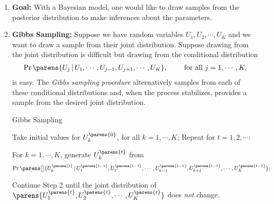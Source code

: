 \documentclass[12pt]{article}
\begin{document}
\begin{enumerate}[label=\textbf{\arabic*.}]
	
	\item \textbf{Goal:} With a Bayesian model, one would like to draw samples from the posterior distribution to make inferences about the parameters. 
	
	\item \textbf{Gibbs Sampling:} Suppose we have random variables $U_1, U_2, \cdots, U_K$ and we want to draw a sample from their joint distribution. Suppose drawing from the joint distribution is difficult but drawing from the conditional distribution 
	\begin{align*}
		\Pr \parens{U_j \,\vert\, U_1, \cdots, U_{j-1}, U_{j+1}, \cdots, U_K}, \qquad \text{ for all } j = 1, \cdots, K, 
	\end{align*}
	is easy. The \emph{Gibbs sampling procedure} alternatively samples from each of these conditional distributions and, when the process stabilizes, provides a sample from the desired joint distribution. 
	
	\begin{minipage}{\linewidth}
		\begin{algorithm}[H]
			\caption{Gibbs Sampling}\label{algo-gibbs}
			\begin{algorithmic}[1]
				\STATE Take initial values for $U_k^{\parens{0}}$, for all $k = 1, \cdots, K$; 
				\STATE Repeat for $t = 1, 2, \cdots$: 
				
				For $k = 1, \cdots, K$, generate $U_k^{\parens{t}}$ from 
				\begin{align*}
					\Pr \parens[\big]{U_k^{\parens{t}} \,\vert\, U_1^{\parens{t-1}}, U_2^{\parens{t-1}}, \cdots, U_{k-1}^{\parens{t-1}}, U_{k+1}^{\parens{t-1}}, \cdots, U_K^{\parens{t-1}}}; 
				\end{align*}
				
				\STATE Continue Step 2 until the joint distribution of $\parens{U_1^{\parens{t}}, U_2^{\parens{t}}, \cdots, U_K^{\parens{t}}}$ does \emph{not} change. 
			\end{algorithmic}
		\end{algorithm}
	\end{minipage}
	

\end{enumerate}
\end{document}
